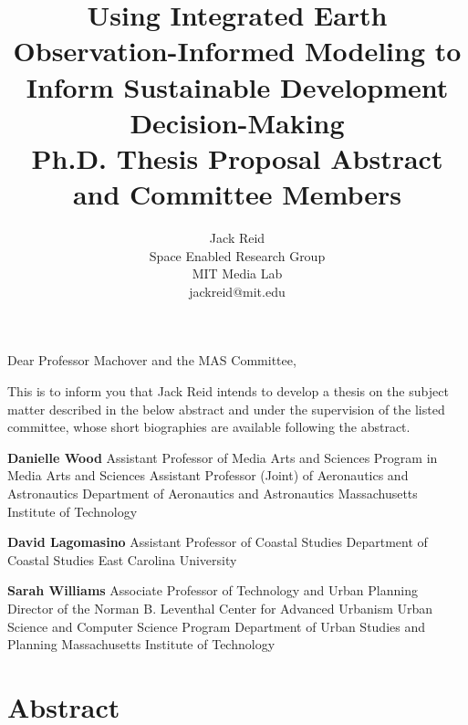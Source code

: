 \documentclass[notitlepage]{report}
\newcommand{\compr}{Danielle Wood}
\newcommand{\comte}{David Lagomasino}
\newcommand{\comco}{Sarah Williams}
\newcommand{\comprcredentials}{\newline\indent Assistant Professor of Media Arts and Sciences \newline\indent Program in Media Arts and Sciences \newline\indent Assistant Professor (Joint) of Aeronautics and Astronautics \newline\indent Department of Aeronautics and Astronautics \newline\indent Massachusetts Institute of Technology}
\newcommand{\comtecredentials}{\newline\indent Assistant Professor of Coastal Studies \newline\indent Department of Coastal Studies \newline\indent East Carolina University}
\newcommand{\comcocredentials}{\newline\indent Associate Professor of Technology and Urban Planning \newline\indent  Director of the Norman B. Leventhal Center for Advanced Urbanism \newline\indent Urban Science and Computer Science Program \newline\indent Department of Urban Studies and Planning \newline\indent Massachusetts Institute of Technology}
\begin{document}
\pretitle{\begin{center}\Huge\bfseries}
\posttitle{\par\end{center}\vskip 0.5em}
\preauthor{\begin{center}\Large\ttfamily}
\postauthor{\end{center}}
\predate{\par\large\centering}
\postdate{\par}

\title{Using Integrated Earth Observation-Informed Modeling to Inform Sustainable Development Decision-Making \\  
\large Ph.D. Thesis Proposal Abstract and Committee Members} 
\author{%
Jack Reid\\ 
Space Enabled Research Group\\
MIT Media Lab\\
jackreid@mit.edu}

\maketitle

\section*{ }
Dear Professor Machover and the MAS Committee,
\vspace{\baselineskip}

\noindent This is to inform you that Jack Reid intends to develop a thesis on the subject matter described in the below abstract and under the supervision of the listed committee, whose short biographies are available following the abstract.

\vspace{\baselineskip}

\textbf{\compr} \comprcredentials 
 
\vspace{\baselineskip}

\textbf{\comte} \comtecredentials

\vspace{\baselineskip}

\textbf{\comco} \comcocredentials

\thispagestyle{plain}
\pagestyle{plain}


\chapter*{\vspace{-2.0cm}Abstract}
\end{document}
